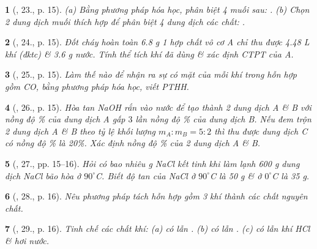 \documentclass{article}
\newtheorem{baitoan}{}
\begin{document}
\begin{baitoan}[\cite{An_400_BT_Hoa_Hoc_9}, 23., p. 15]
	(a) Bằng phương pháp hóa học, phân biệt 4 muối sau: {\rm{}}. (b) Chọn 2 dung dịch muối thích hợp để phân biệt 4 dung dịch các chất: {\rm{}}.
\end{baitoan}

\begin{baitoan}[\cite{An_400_BT_Hoa_Hoc_9}, 24., p. 15]
	Đốt cháy hoàn toàn {\rm6.8 g} 1 hợp chất vô cơ A chỉ thu được {\rm4.48 L} khí {\rm{}} (đktc) \& {\rm3.6 g} nước. Tính thể tích khí {\rm{}} đã dùng \& xác định {\rm CTPT} của A.
\end{baitoan}

\begin{baitoan}[\cite{An_400_BT_Hoa_Hoc_9}, 25., p. 15]
	Làm thế nào để nhận ra sự có mặt của mỗi khí trong hỗn hợp gồm {\rm CO, } bằng phương pháp hóa học, viết {\rm PTHH}.
\end{baitoan}

\begin{baitoan}[\cite{An_400_BT_Hoa_Hoc_9}, 26., p. 15]
	Hòa tan {\rm NaOH} rắn vào nước để tạo thành 2 dung dịch A \& B với nồng độ {\rm\%} của dung dịch A gấp $3$ lần nồng độ {\rm\%} của dung dịch B. Nếu đem trộn 2 dung dịch A \& B theo tỷ lệ khối lượng $m_A:m_B = 5:2$ thì thu được dung dịch C có nồng độ {\rm\%} là {\rm20\%}. Xác định nồng độ {\rm\%} của 2 dung dịch A \& B.
\end{baitoan}

\begin{baitoan}[\cite{An_400_BT_Hoa_Hoc_9}, 27., pp. 15--16]
	Hỏi có bao nhiêu {\rm g NaCl} kết tinh khi làm lạnh {\rm600 g} dung dịch {\rm NaCl} bão hòa ở $90^\circ${\rm C}. Biết độ tan của {\rm NaCl} ở $90^\circ${\rm C} là {\rm50 g} \& ở $0^\circ${\rm C} là {\rm35 g}.
\end{baitoan}

\begin{baitoan}[\cite{An_400_BT_Hoa_Hoc_9}, 28., p. 16]
	Nêu phương pháp tách hỗn hợp gồm 3 khí {\rm{}} thành các chất nguyên chất.
\end{baitoan}

\begin{baitoan}[\cite{An_400_BT_Hoa_Hoc_9}, 29., p. 16]
	Tinh chế các chất khí: (a) {\rm{}} có lẫn {\rm{}}. (b) {\rm{}} có lẫn {\rm{}}. (c) {\rm{}} có lẫn khí {\rm HCl} \& hơi nước.
\end{baitoan}
\end{document}
